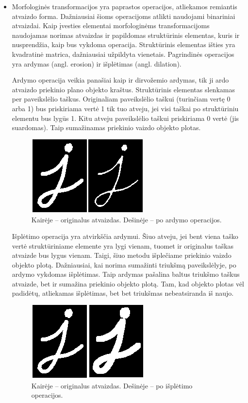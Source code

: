 \documentclass[a4paper,12pt]{article}
\begin{document}
\begin{itemize}
	\item Morfologinės transformacijos yra paprastos operacijos, atliekamos remiantis atvaizdo forma. Dažniausiai šioms operacijoms atlikti naudojami binariniai atvaizdai. Kaip įvesties elementai morfologinėms transformacijoms naudojamas norimas atvaizdas ir papildomas struktūrinis elementas, kuris ir nusprendžia, kaip bus vykdoma operacija. Struktūrinis elementas išties yra kvadratinė matrica, dažniausiai užpildyta vienetais. Pagrindinės operacijos yra ardymas (angl. erosion) ir išplėtimas (angl. dilation).
	
	Ardymo operacija veikia panašiai kaip ir dirvožemio ardymas, tik ji ardo atvaizdo priekinio plano objekto kraštus. Struktūrinis elementas slenkamas per paveikslėlio taškus. Originaliam paveikslėlio taškui (turinčiam vertę 0 arba 1) bus priskiriama vertė 1 tik tuo atveju, jei visi taškai po struktūriniu elementu bus lygūs 1. Kitu atveju paveikslėlio taškui priskiriama 0 vertė (jis suardomas). Taip sumažinamas priekinio vaizdo objekto plotas.
			\begin{figure}[H]
				\centering
				\includegraphics[scale=0.5]{images/erosion1}
				\caption{Kairėje – originalus atvaizdas. Dešinėje – po ardymo operacijos.}   %
				\label{img:erosion1}
			\end{figure} 
	
	Išplėtimo operacija yra atvirkščia ardymui. Šiuo atveju, jei bent viena taško vertė struktūriniame elemente yra lygi vienam, tuomet ir originalus taškas atvaizde bus lygus vienam. Taigi, šiuo metodu išplečiame priekinio vaizdo objekto plotą. Dažniausiai, kai norima sumažinti triukšmą paveikslėlyje, po ardymo vykdomas išplėtimas. Taip ardymas pašalina baltus triukšmo taškus atvaizde, bet ir sumažina priekinio objekto plotą. Tam, kad objekto plotas vėl padidėtų, atliekamas išplėtimas, bet bet triukšmas nebeatsiranda iš naujo.
				\begin{figure}[H]
					\centering
					\includegraphics[scale=0.5]{images/dilation}
					\caption{Kairėje – originalus atvaizdas. Dešinėje – po išplėtimo operacijos.}   %
					\label{img:dilation}
				\end{figure} 
	

\end{itemize}
\end{document}
